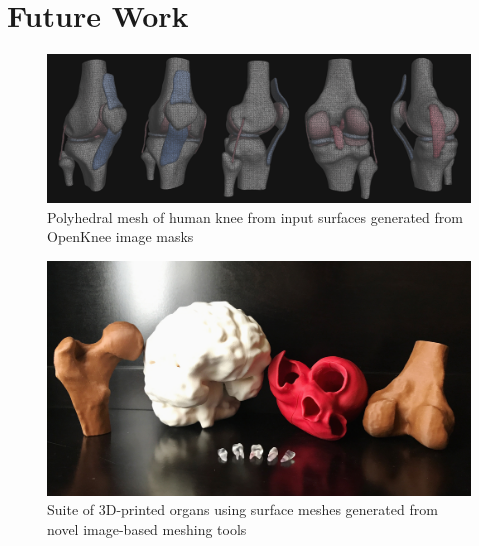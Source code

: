 \chapter{Future Work}

\begin{figure}
\centering
		\includegraphics[width=1.0\textwidth]{media/7-polyknee/fullmesh.png}
%
\caption{Polyhedral mesh of human knee from input surfaces generated from OpenKnee image masks}
\label{fig:polyknee}
\end{figure}

\begin{figure}
\centering
		\includegraphics[width=1.0\textwidth]{media/6-3dprint/3dprint.jpg}
%
\caption{Suite of 3D-printed organs using surface meshes generated from novel image-based meshing tools}
\label{fig:3dprint}
\end{figure}


